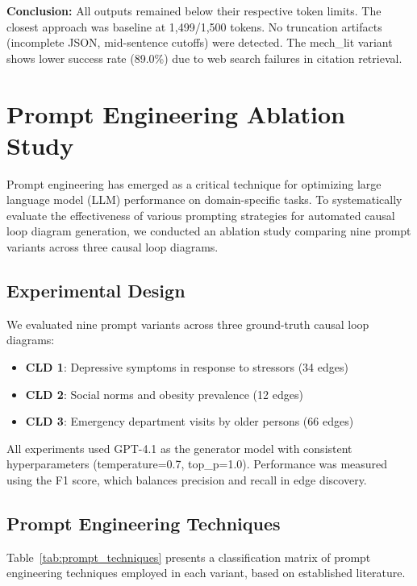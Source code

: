 \textbf{Conclusion:} All outputs remained below their respective token limits. The closest approach was baseline at 1,499/1,500 tokens. No truncation artifacts (incomplete JSON, mid-sentence cutoffs) were detected. The mech\_lit variant shows lower success rate (89.0\%) due to web search failures in citation retrieval.

\section{Prompt Engineering Ablation Study}
\label{sec:ablation_edge}

Prompt engineering has emerged as a critical technique for optimizing large language model (LLM) performance on domain-specific tasks. To systematically evaluate the effectiveness of various prompting strategies for automated causal loop diagram generation, we conducted an ablation study comparing nine prompt variants across three causal loop diagrams.

\subsection{Experimental Design}

We evaluated nine prompt variants across three ground-truth causal loop diagrams:
\begin{itemize}[noitemsep]
    \item \textbf{CLD 1}: Depressive symptoms in response to stressors (34 edges)
    \item \textbf{CLD 2}: Social norms and obesity prevalence (12 edges)
    \item \textbf{CLD 3}: Emergency department visits by older persons (66 edges)
\end{itemize}

All experiments used GPT-4.1 as the generator model with consistent hyperparameters (temperature=0.7, top\_p=1.0). Performance was measured using the F1 score, which balances precision and recall in edge discovery.

\subsection{Prompt Engineering Techniques}

Table~\ref{tab:prompt_techniques} presents a classification matrix of prompt engineering techniques employed in each variant, based on established literature.


